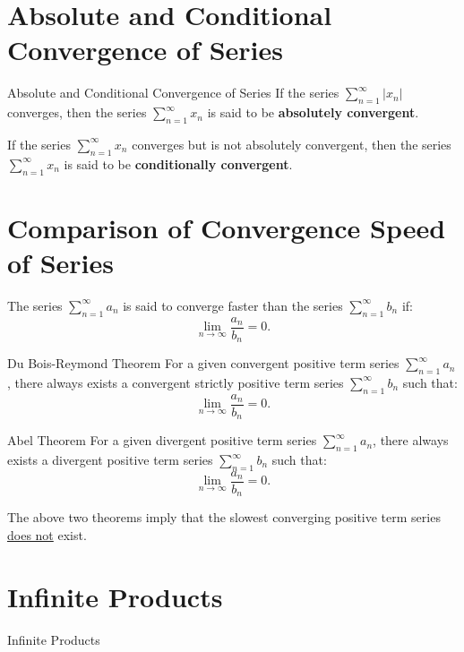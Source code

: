 \documentclass[11pt]{../../TexTemplate/elegantbook}
\begin{document}
\section{Absolute and Conditional Convergence of Series}
\begin{definition}{Absolute and Conditional Convergence of Series}
    If the series \( \sum_{n=1}^{\infty} |x_n| \) converges, 
    then the series \( \sum_{n=1}^{\infty} x_n \) is said to be \textbf{absolutely convergent}.

    If the series \( \sum_{n=1}^{\infty} x_n \) converges but is not absolutely convergent, 
    then the series \( \sum_{n=1}^{\infty} x_n \) is said to be \textbf{conditionally convergent}.
\end{definition}

\section{Comparison of Convergence Speed of Series}
The series \( \sum_{n=1}^{\infty} a_n \) is said to converge faster than the series \( \sum_{n=1}^{\infty} b_n \) if:
\[
\lim_{n \to \infty} \frac{a_n}{b_n} = 0.
\]

\begin{theorem}{Du Bois-Reymond Theorem}
    For a given convergent positive term series \( \sum_{n=1}^{\infty} a_n \), there always exists a convergent strictly positive term series \( \sum_{n=1}^{\infty} b_n \) such that:
    \[
    \lim_{n \to \infty} \frac{a_n}{b_n} = 0.
    \]
\end{theorem}

\begin{theorem}{Abel Theorem}
    For a given divergent positive term series \( \sum_{n=1}^{\infty} a_n \), there always exists a divergent positive term series \( \sum_{n=1}^{\infty} b_n \) such that:
    \[
    \lim_{n \to \infty} \frac{a_n}{b_n} = 0.
    \]
\end{theorem}

\begin{remark}
    The above two theorems imply that the slowest converging positive term series \underline{does not} exist.
\end{remark}



\section{Infinite Products}
\begin{leftbarTitle}{Infinite Products}\end{leftbarTitle}
\end{document}
